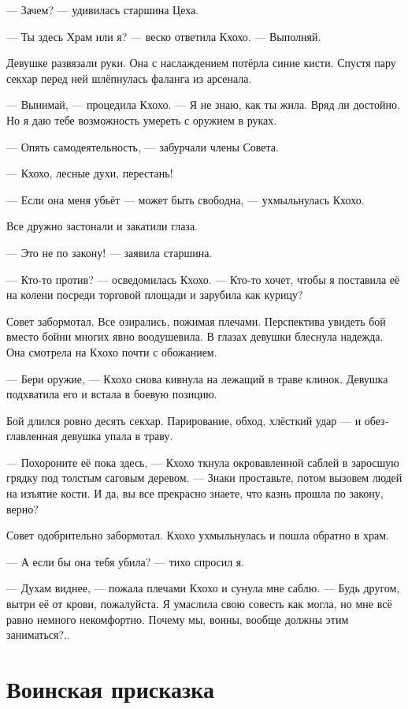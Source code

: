 \documentclass[a4paper,12pt,fleqn]{book}\usepackage{cooltooltips}\usepackage{polyglossia}\setdefaultlanguage[babelshorthands=true]{russian}\setotherlanguage{english}\defaultfontfeatures{Ligatures=TeX,Mapping=tex-text} \usepackage{xcolor}\definecolor{lightgray}{HTML}{bbbbbb}\color{lightgray}\newcommand{\ml}[3]{\textenglish{\textcolor{black}{#3}}}
\begin{document}
{--- Зачем? --- удивилась старшина Цеха.

--- Ты здесь Храм или я? --- веско ответила Кхохо.
--- Выполняй.

Девушке развязали руки.
Она с наслаждением потёрла синие кисти.
Спустя пару секхар перед ней шлёпнулась фаланга из арсенала.

--- Вынимай, --- процедила Кхохо.
--- Я не знаю, как ты жила.
Вряд ли достойно.
Но я даю тебе возможность умереть с оружием в руках.

--- Опять самодеятельность, --- забурчали члены Совета.

--- Кхохо, лесные духи, перестань!

--- Если она меня убьёт --- может быть свободна, --- ухмыльнулась Кхохо.

Все дружно застонали и закатили глаза.

--- Это не по закону! --- заявила старшина.

--- Кто-то против? --- осведомилась Кхохо.
--- Кто-то хочет, чтобы я поставила её на колени посреди торговой площади и зарубила как курицу?

Совет забормотал.
Все озирались, пожимая плечами.
Перспектива увидеть бой вместо бойни многих явно воодушевила.
В глазах девушки блеснула надежда.
Она смотрела на Кхохо почти с обожанием.

--- Бери оружие, --- Кхохо снова кивнула на лежащий в траве клинок.
Девушка подхватила его и встала в боевую позицию.

Бой длился ровно десять секхар.
Парирование, обход, хлёсткий удар --- и обезглавленная девушка упала в траву.

--- Похороните её пока здесь, --- Кхохо ткнула окровавленной саблей в заросшую грядку под толстым саговым деревом.
--- Знаки проставьте, потом вызовем людей на изъятие кости.
И да, вы все прекрасно знаете, что казнь прошла по закону, верно?

Совет одобрительно забормотал.
Кхохо ухмыльнулась и пошла обратно в храм.

--- А если бы она тебя убила? --- тихо спросил я.

--- Духам виднее, --- пожала плечами Кхохо и сунула мне саблю.
--- Будь другом, вытри её от крови, пожалуйста.
Я умаслила свою совесть как могла, но мне всё равно немного некомфортно.
Почему мы, воины, вообще должны этим заниматься?..

\section{Воинская присказка}

}
\end{document}
